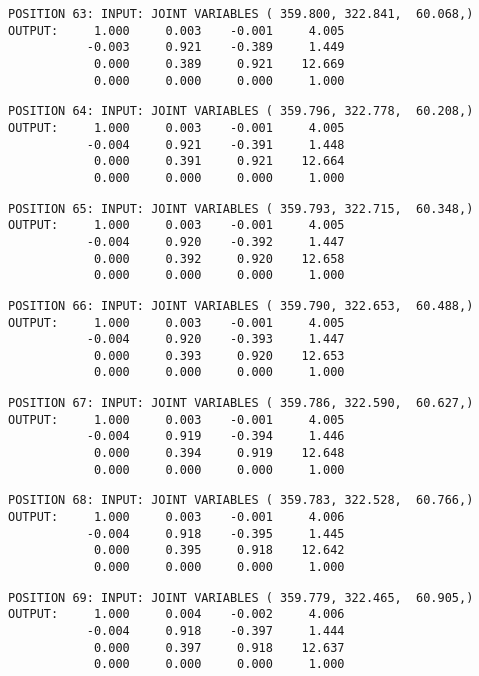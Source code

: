 \begin{verbatim}
POSITION 63: INPUT: JOINT VARIABLES ( 359.800, 322.841,  60.068,)
OUTPUT:     1.000     0.003    -0.001     4.005
           -0.003     0.921    -0.389     1.449
            0.000     0.389     0.921    12.669
            0.000     0.000     0.000     1.000
\end{verbatim} \pagebreak[1]\begin{verbatim}
POSITION 64: INPUT: JOINT VARIABLES ( 359.796, 322.778,  60.208,)
OUTPUT:     1.000     0.003    -0.001     4.005
           -0.004     0.921    -0.391     1.448
            0.000     0.391     0.921    12.664
            0.000     0.000     0.000     1.000
\end{verbatim} \pagebreak[1]\begin{verbatim}
POSITION 65: INPUT: JOINT VARIABLES ( 359.793, 322.715,  60.348,)
OUTPUT:     1.000     0.003    -0.001     4.005
           -0.004     0.920    -0.392     1.447
            0.000     0.392     0.920    12.658
            0.000     0.000     0.000     1.000
\end{verbatim} \pagebreak[1]\begin{verbatim}
POSITION 66: INPUT: JOINT VARIABLES ( 359.790, 322.653,  60.488,)
OUTPUT:     1.000     0.003    -0.001     4.005
           -0.004     0.920    -0.393     1.447
            0.000     0.393     0.920    12.653
            0.000     0.000     0.000     1.000
\end{verbatim} \pagebreak[1]\begin{verbatim}
POSITION 67: INPUT: JOINT VARIABLES ( 359.786, 322.590,  60.627,)
OUTPUT:     1.000     0.003    -0.001     4.005
           -0.004     0.919    -0.394     1.446
            0.000     0.394     0.919    12.648
            0.000     0.000     0.000     1.000
\end{verbatim} \pagebreak[1]\begin{verbatim}
POSITION 68: INPUT: JOINT VARIABLES ( 359.783, 322.528,  60.766,)
OUTPUT:     1.000     0.003    -0.001     4.006
           -0.004     0.918    -0.395     1.445
            0.000     0.395     0.918    12.642
            0.000     0.000     0.000     1.000
\end{verbatim} \pagebreak[1]\begin{verbatim}
POSITION 69: INPUT: JOINT VARIABLES ( 359.779, 322.465,  60.905,)
OUTPUT:     1.000     0.004    -0.002     4.006
           -0.004     0.918    -0.397     1.444
            0.000     0.397     0.918    12.637
            0.000     0.000     0.000     1.000
\end{verbatim} \pagebreak[1]\begin{verbatim}

\end{verbatim}
